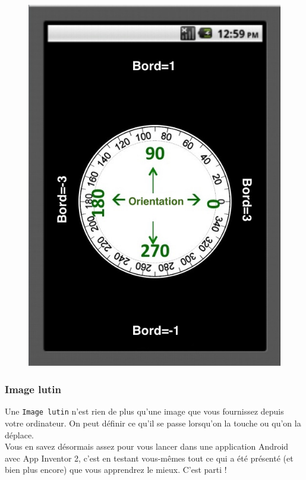 \documentclass[12t,a4paper]{article}
\begin{document}
\begin{figure}[h!]
\centering
\includegraphics[scale=0.3]{edges_headings_diagram.jpg}
\end{figure}

\subsubsection{Image lutin}
Une \texttt{Image lutin} n'est rien de plus qu'une image que vous fournissez depuis votre ordinateur. On peut définir ce qu'il se passe lorsqu'on la touche ou qu'on la déplace. \\

Vous en savez désormais assez pour vous lancer dans une application Android avec App Inventor 2, c'est en testant vous-mêmes tout ce qui a été présenté (et bien plus encore) que vous apprendrez le mieux. C'est parti !
\end{document}

